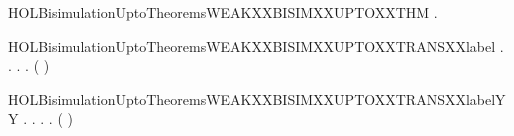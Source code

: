 \newcommand{\HOLBisimulationUptoTheoremsWEAKXXBISIMXXUPTOXXLEMMA}{\UseVerbatim{HOLBisimulationUptoTheoremsWEAKXXBISIMXXUPTOXXLEMMA}}
\begin{SaveVerbatim}{HOLBisimulationUptoTheoremsWEAKXXBISIMXXUPTOXXTHM}
\HOLTokenTurnstile{} \HOLSymConst{\HOLTokenForall{}}.   \HOLSymConst{\HOLTokenImp{}}   
\end{SaveVerbatim}
\newcommand{\HOLBisimulationUptoTheoremsWEAKXXBISIMXXUPTOXXTHM}{\UseVerbatim{HOLBisimulationUptoTheoremsWEAKXXBISIMXXUPTOXXTHM}}
\begin{SaveVerbatim}{HOLBisimulationUptoTheoremsWEAKXXBISIMXXUPTOXXTRANSXXlabel}
\HOLTokenTurnstile{} \HOLSymConst{\HOLTokenForall{}}.
         \HOLSymConst{\HOLTokenImp{}}
       \HOLSymConst{\HOLTokenForall{}} .
              \HOLSymConst{\HOLTokenImp{}}
           \HOLSymConst{\HOLTokenForall{}} .
                \HOLTokenTransBegin{} \HOLTokenTransEnd {} \HOLSymConst{\HOLTokenImp{}}
               \HOLSymConst{\HOLTokenExists{}}.
                    \HOLTokenWeakTransBegin{} \HOLTokenWeakTransEnd {} \HOLSymConst{\HOLTokenConj{}}
                   (    )  
\end{SaveVerbatim}
\newcommand{\HOLBisimulationUptoTheoremsWEAKXXBISIMXXUPTOXXTRANSXXlabel}{\UseVerbatim{HOLBisimulationUptoTheoremsWEAKXXBISIMXXUPTOXXTRANSXXlabel}}
\begin{SaveVerbatim}{HOLBisimulationUptoTheoremsWEAKXXBISIMXXUPTOXXTRANSXXlabelYY}
\HOLTokenTurnstile{} \HOLSymConst{\HOLTokenForall{}}.
         \HOLSymConst{\HOLTokenImp{}}
       \HOLSymConst{\HOLTokenForall{}} .
              \HOLSymConst{\HOLTokenImp{}}
           \HOLSymConst{\HOLTokenForall{}} .
                \HOLTokenTransBegin{} \HOLTokenTransEnd {} \HOLSymConst{\HOLTokenImp{}}
               \HOLSymConst{\HOLTokenExists{}}.
                    \HOLTokenWeakTransBegin{} \HOLTokenWeakTransEnd {} \HOLSymConst{\HOLTokenConj{}}
                   (    )  
\end{SaveVerbatim}
